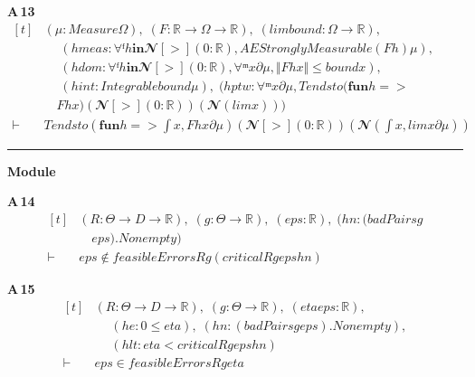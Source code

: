 \noindent\textbf{A\,13}\quad{}
{\footnotesize\[ \begin{aligned}[t]
&(\mu : \mathit{Measure} \Omega ),\; (\mathit{F} : \mathbb{R} \to \Omega \to \mathbb{R} ),\; (\mathit{lim} \mathit{bound} : \Omega \to \mathbb{R} ),\\
&\quad \; (\mathit{hmeas} : \forall  ᶠ \mathit{h} \mathbf{in} 𝓝[>] (0:\mathbb{R} ), \mathit{AEStronglyMeasurable} (\mathit{F} \mathit{h}) \mu ),\\
&\quad \; (\mathit{hdom} : \forall  ᶠ \mathit{h} \mathbf{in} 𝓝[>] (0:\mathbb{R} ), \forall  ᵐ \mathit{x} ∂\mu , \Vert \mathit{F} \mathit{h} \mathit{x}\Vert \leq \mathit{bound} \mathit{x}),\\
&\quad \; (\mathit{hint} : \mathit{Integrable} \mathit{bound} \mu ),\; (\mathit{hptw} : \forall  ᵐ \mathit{x} ∂\mu , \mathit{Tendsto} (\mathbf{fun} \mathit{h} =>\\
&\quad \mathit{F} \mathit{h} \mathit{x}) (𝓝[>] (0:\mathbb{R} )) (𝓝 (\mathit{lim} \mathit{x})))\\
\vdash\;&\mathit{Tendsto} (\mathbf{fun} \mathit{h} => \int \mathit{x}, \mathit{F} \mathit{h} \mathit{x} ∂\mu ) (𝓝[>] (0:\mathbb{R} )) (𝓝 (\int \mathit{x}, \mathit{lim} \mathit{x} ∂\mu ))
\end{aligned} \]}

\vspace{4pt}\noindent\rule{\columnwidth}{0.4pt}\par\vspace{2pt}
\noindent\textbf{Module }\par\vspace{3pt}

\noindent\textbf{A\,14}\quad{}
{\footnotesize\[ \begin{aligned}[t]
&(\mathit{R} : \Theta \to \mathit{D} \to \mathbb{R} ),\; (\mathit{g} : \Theta \to \mathbb{R} ),\; (\mathit{eps} : \mathbb{R} ),\; (\mathit{hn} : (\mathit{badPairs} \mathit{g}\\
&\quad \mathit{eps}).\mathit{Nonempty})\\
\vdash\;&\mathit{eps} \notin \mathit{feasibleErrors} \mathit{R} \mathit{g} (\mathit{critical} \mathit{R} \mathit{g} \mathit{eps} \mathit{hn})
\end{aligned} \]}

\noindent\textbf{A\,15}\quad{}
{\footnotesize\[ \begin{aligned}[t]
&(\mathit{R} : \Theta \to \mathit{D} \to \mathbb{R} ),\; (\mathit{g} : \Theta \to \mathbb{R} ),\; (\mathit{eta} \mathit{eps} : \mathbb{R} ),\\
&\quad \; (\mathit{he} : 0 \leq \mathit{eta}),\; (\mathit{hn} : (\mathit{badPairs} \mathit{g} \mathit{eps}).\mathit{Nonempty}),\\
&\quad \; (\mathit{hlt} : \mathit{eta}<\mathit{critical} \mathit{R} \mathit{g} \mathit{eps} \mathit{hn})\\
\vdash\;&\mathit{eps} \in \mathit{feasibleErrors} \mathit{R} \mathit{g} \mathit{eta}
\end{aligned} \]}

